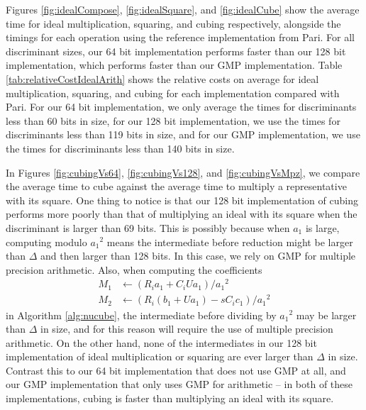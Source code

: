 \documentclass{ucalgthes1}
\theoremstyle{definition}
\begin{document}
Figures \ref{fig:idealCompose}, \ref{fig:idealSquare}, and \ref{fig:idealCube} show the average time for ideal multiplication, squaring, and cubing respectively, alongside the timings for each operation using the reference implementation from Pari.  For all discriminant sizes, our 64 bit implementation performs faster than our 128 bit implementation, which performs faster than our GMP implementation.  Table \ref{tab:relativeCostIdealArith} shows the relative costs on average for ideal multiplication, squaring, and cubing for each implementation compared with Pari. For our 64 bit implementation, we only average the times for discriminants less than 60 bits in size, for our 128 bit implementation, we use the times for discriminants less than 119 bits in size, and for our GMP implementation, we use the times for discriminants less than 140 bits in size.


In Figures \ref{fig:cubingVs64}, \ref{fig:cubingVs128}, and \ref{fig:cubingVsMpz}, we compare the average time to cube against the average time to multiply a representative with its square.  One thing to notice is that our 128 bit implementation of cubing performs more poorly than that of multiplying an ideal with its square when the discriminant is larger than 69 bits.  This is possibly because when $a_1$ is large, computing modulo ${a_1}^2$ means the intermediate before reduction might be larger than $\Delta$ and then larger than 128 bits.  In this case, we rely on GMP for multiple precision arithmetic.  Also, when computing the coefficients 
\begin{align*}
M_1 &\gets (R_ia_1 + C_iUa_1) / {a_1}^2 \\
M_2 &\gets (R_i(b_1 + Ua_1) - sC_ic_1) / {a_1}^2
\end{align*}
in Algorithm \ref{alg:nucube}, the intermediate before dividing by ${a_1}^2$ may be larger than $\Delta$ in size, and for this reason will require the use of multiple precision arithmetic.  On the other hand, none of the intermediates in our 128 bit implementation of ideal multiplication or squaring are ever larger than $\Delta$ in size.  Contrast this to our 64 bit implementation that does not use GMP at all, and our GMP implementation that only uses GMP for arithmetic -- in both of these implementations, cubing is faster than multiplying an ideal with its square.
\end{document}
